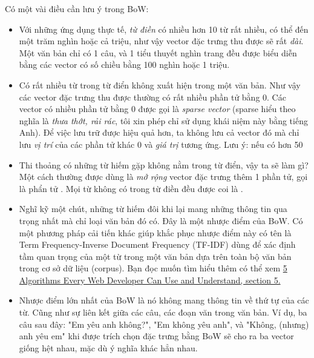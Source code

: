 Có một vài điều cần lưu ý trong BoW: 
\begin{itemize}
    \item Với những ứng dụng thực tế, \textit{từ điền} có nhiều hơn 10 từ rất nhiều, có thể đến một trăm nghìn hoặc cả triệu, như vậy vector đặc trưng thu được sẽ rất \textit{dài}. Một văn bản chỉ có 1 câu, và 1 tiểu thuyết nghìn trang đều được biểu diễn bằng các vector có số chiều bằng 100 nghìn hoặc 1 triệu.

    \item Có rất nhiều từ trong từ điển không xuất hiện trong một văn bản. Như vậy các vector đặc trưng thu được thường có rất nhiều phần tử bằng 0. Các vector có nhiều phần tử bằng 0 được gọi là \textit{sparse vector} (sparse hiểu theo nghĩa là \textit{thưa thớt, rải rác}, tôi xin phép chỉ sử dụng khái niệm này bằng tiếng Anh). Để việc lưu trữ được hiệu quả hơn, ta không lưu cả vector đó mà chỉ lưu \textit{vị trí} của các phần tử khác 0 và \textit{giá trị} tương ứng. Lưu ý: nếu có hơn 50%

    \item Thi thoảng có những từ hiếm gặp không nằm trong từ điển, vậy ta sẽ làm gì? Một cách thường được dùng là \textit{mở rộng} vector đặc trưng thêm 1 phần tử, gọi là phẩn tử . Mọi từ không có trong từ điền đều được coi là . 

    \item Nghĩ kỹ một chút, những từ hiếm đôi khi lại mang những thông tin qua trọng nhất mà chỉ loại văn bản đó có. Đây là một nhược điểm của BoW. Có một phương pháp cải tiến khác giúp khắc phục nhược điểm này có tên là Term Frequency-Inverse Document Frequency (TF-IDF) dùng để xác định tầm quan trọng của một từ trong một văn bản dựa trên toàn bộ văn bản trong cơ sở dữ liệu (corpus). Bạn đọc muốn tìm hiểu thêm có thể xem \href{https://www.gitbook.com/book/lizrush/algorithms-for-webdevs-ebook/details}{5 Algorithms Every Web Developer Can Use and Understand, section 5.} 

    \item Nhược điểm lớn nhất của BoW là nó không mang thông tin về thứ tự của các từ. Cũng như sự liên kết giữa các câu, các đoạn văn trong văn bản. Ví dụ, ba câu sau đây: "Em yêu anh không?", "Em không yêu anh", và "Không, (nhưng) anh yêu em" khi được trích chọn đặc trưng bằng BoW sẽ cho ra ba vector giống hệt nhau, mặc dù ý nghĩa khác hẳn nhau. 
\end{itemize}
 
